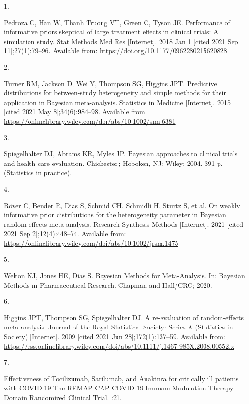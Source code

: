 \documentclass[
  12pt,
]{article}
\newlength{\cslhangindent}
\newlength{\csllabelwidth}
\newlength{\cslentryspacingunit} %
\newenvironment{CSLReferences}[2] %
 {%
  \setlength{\parindent}{0pt}
  \ifodd #1
  \let\oldpar\par
  \def\par{\hangindent=\cslhangindent\oldpar}
  \fi
  \setlength{\parskip}{#2\cslentryspacingunit}
 }%
 {}
\newcommand{\CSLLeftMargin}[1]{\parbox[t]{\csllabelwidth}{#1}}
\newcommand{\CSLRightInline}[1]{\parbox[t]{\linewidth - \csllabelwidth}{#1}\break}
\begin{document}
\hypertarget{refs}{}
\begin{CSLReferences}{0}{0}
\leavevmode{}%
\CSLLeftMargin{1. }
\CSLRightInline{Pedroza C, Han W, Thanh Truong VT, Green C, Tyson JE.
Performance of informative priors skeptical of large treatment effects
in clinical trials: A simulation study. Stat Methods Med Res
{[}Internet{]}. 2018 Jan 1 {[}cited 2021 Sep 11{]};27(1):79--96.
Available from: \url{https://doi.org/10.1177/0962280215620828}}

\leavevmode{}%
\CSLLeftMargin{2. }
\CSLRightInline{Turner RM, Jackson D, Wei Y, Thompson SG, Higgins JPT.
Predictive distributions for between-study heterogeneity and simple
methods for their application in Bayesian meta-analysis. Statistics in
Medicine {[}Internet{]}. 2015 {[}cited 2021 May 8{]};34(6):984--98.
Available from:
\url{https://onlinelibrary.wiley.com/doi/abs/10.1002/sim.6381}}

\leavevmode{}%
\CSLLeftMargin{3. }
\CSLRightInline{Spiegelhalter DJ, Abrams KR, Myles JP. Bayesian
approaches to clinical trials and health care evaluation. Chichester\,;
Hoboken, NJ: Wiley; 2004. 391 p. (Statistics in practice). }

\leavevmode{}%
\CSLLeftMargin{4. }
\CSLRightInline{Röver C, Bender R, Dias S, Schmid CH, Schmidli H, Sturtz
S, et al. On weakly informative prior distributions for the
heterogeneity parameter in Bayesian random-effects meta-analysis.
Research Synthesis Methods {[}Internet{]}. 2021 {[}cited 2021 Sep
2{]};12(4):448--74. Available from:
\url{https://onlinelibrary.wiley.com/doi/abs/10.1002/jrsm.1475}}

\leavevmode{}%
\CSLLeftMargin{5. }
\CSLRightInline{Welton NJ, Jones HE, Dias S. Bayesian Methods for
Meta-Analysis. In: Bayesian Methods in Pharmaceutical Research. Chapman
and Hall/CRC; 2020. }

\leavevmode{}%
\CSLLeftMargin{6. }
\CSLRightInline{Higgins JPT, Thompson SG, Spiegelhalter DJ. A
re-evaluation of random-effects meta-analysis. Journal of the Royal
Statistical Society: Series A (Statistics in Society) {[}Internet{]}.
2009 {[}cited 2021 Jun 28{]};172(1):137--59. Available from:
\url{https://rss.onlinelibrary.wiley.com/doi/abs/10.1111/j.1467-985X.2008.00552.x}}

\leavevmode{}%
\CSLLeftMargin{7. }
\CSLRightInline{Effectiveness of Tocilizumab, Sarilumab, and Anakinra
for critically ill patients with COVID-19 The REMAP-CAP COVID-19 Immune
Modulation Therapy Domain Randomized Clinical Trial. :21. }


\end{CSLReferences}
\end{document}
